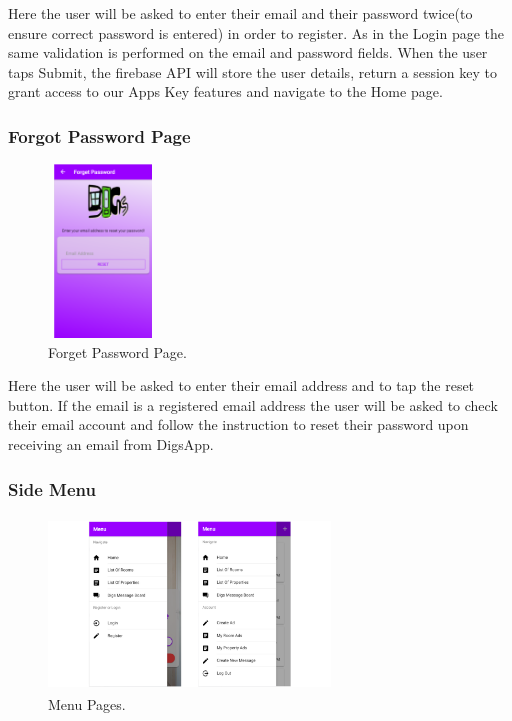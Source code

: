 \noindent Here the user will be asked to enter their email and their password twice(to ensure correct password is entered) in order to register. As in the Login page the same validation is performed on the email and password fields. When the user taps Submit, the firebase API will store the user details, return a session key to grant access to our Apps Key features and navigate to the Home page.

\subsubsection{Forgot Password Page}

\begin{figure}[h]
\centering
\includegraphics[width=2.9cm, height=4.6cm]{img/Forget}
\caption{Forget Password Page.}
\end{figure}

\noindent Here the user will be asked to enter their email address and to tap the reset button. If the email is a registered email address the user will be asked to check their email account and follow the instruction to reset their password upon receiving an email from DigsApp.

\subsubsection{Side Menu}

\begin{figure}[h]
\centering
\includegraphics[width=7.5cm, height=4.6cm]{img/Menu}
\caption{Menu Pages.}
\end{figure}

